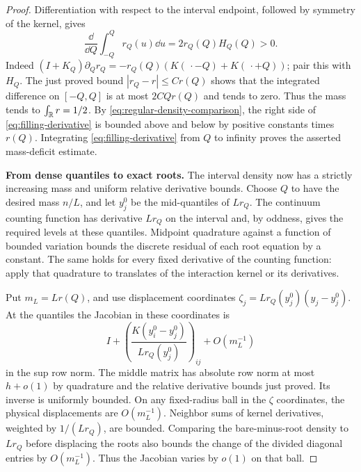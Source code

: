 \begin{proof}
Differentiation with respect to the interval endpoint, followed by
symmetry of the kernel, gives
\begin{equation}\label{eq:filling-derivative}
 \frac{\dd}{\dd Q}\int_{-Q}^Q r_Q(u)\dd u
       =2r_Q(Q)H_Q(Q)>0.
\end{equation}
Indeed $(I+K_Q)\partial_Qr_Q
=-r_Q(Q)(K(\,\cdot-Q)+K(\,\cdot+Q))$; pair this with $H_Q$.
The just proved bound $|r_Q-r|\le C r(Q)$ shows that the
integrated difference on $[-Q,Q]$ is at most $2CQr(Q)$ and
tends to zero.  Thus the mass tends to $\int_\mathbb R r=1/2$.
By \eqref{eq:regular-density-comparison}, the right side of
\eqref{eq:filling-derivative} is bounded above and below by
positive constants times $r(Q)$.  Integrating
\eqref{eq:filling-derivative} from $Q$ to infinity proves the
asserted mass-deficit estimate.

\smallskip\noindent\textbf{From dense quantiles to exact roots.}
The interval density now has a strictly increasing mass and uniform
relative derivative bounds. Choose $Q$ to have the desired mass
$n/L$, and let $y_j^0$ be the mid-quantiles of $Lr_Q$.
The continuum counting function has derivative $Lr_Q$ on the
interval and, by oddness, gives the required levels at these
quantiles.  Midpoint quadrature against a function of bounded
variation bounds the discrete residual of each root equation by
a constant.  The same holds for every fixed derivative of the
counting function: apply that quadrature to translates of the
interaction kernel or its derivatives.

Put $m_L=Lr(Q)$, and use displacement coordinates
$\zeta_j=Lr_Q(y_j^0)(y_j-y_j^0)$.  At the quantiles the Jacobian in
these coordinates is
\[
 I+\left(\frac{K(y_i^0-y_j^0)}{Lr_Q(y_j^0)}\right)_{ij}
       +O(m_L^{-1})
\]
in the sup row norm.  The middle matrix has absolute row norm
at most $h+o(1)$ by quadrature and the relative derivative bounds
just proved.  Its inverse is uniformly bounded.
On any fixed-radius ball in the $\zeta$ coordinates, the physical
displacements are $O(m_L^{-1})$.  Neighbor sums of kernel
derivatives, weighted by $1/(Lr_Q)$, are bounded.  Comparing the
bare-minus-root density to $Lr_Q$ before displacing the roots
also bounds the change of the divided diagonal entries by
$O(m_L^{-1})$.  Thus the Jacobian varies by $o(1)$ on that ball.


\end{proof}

